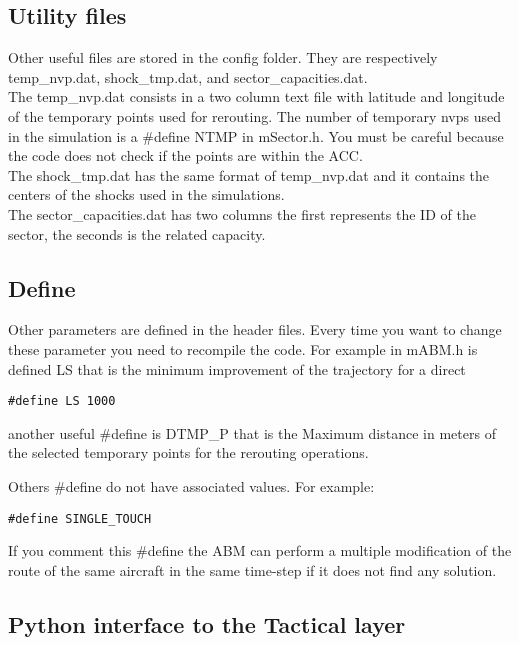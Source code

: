 \documentclass[12pt]{article}
\begin{document}
\subsection{Utility files}
Other useful files are stored in the config folder. They are respectively temp\_nvp.dat, shock\_tmp.dat, and  sector\_capacities.dat.\\

The temp\_nvp.dat consists in a two column text file with latitude and longitude of the temporary points used for rerouting. The number of temporary nvps used in the simulation is a \#define NTMP in mSector.h. You must be careful because the code does not check if the points are within the ACC.\\

The shock\_tmp.dat has the same format of temp\_nvp.dat and it contains the centers of the shocks used in the simulations.\\

The sector\_capacities.dat has two columns the first represents the ID of the sector, the seconds is the related capacity.


\subsection{Define}

Other parameters are defined in the header files. Every time you want to change these parameter you need to recompile the code. For example in mABM.h is defined LS that is the minimum improvement of the trajectory for a direct

\begin{verbatim}
#define LS 1000
\end{verbatim}

another useful \#define is DTMP\_P that is the Maximum distance in meters of the selected temporary points for the rerouting operations.

Others \#define do not have associated values. For example:

\begin{verbatim}
#define SINGLE_TOUCH
\end{verbatim}

If you comment this \#define the ABM can perform a multiple modification of the route of the same aircraft in the same time-step if it does not find any solution.

\subsection{Python interface to the Tactical layer}
\label{subsec:interface}
\end{document}
